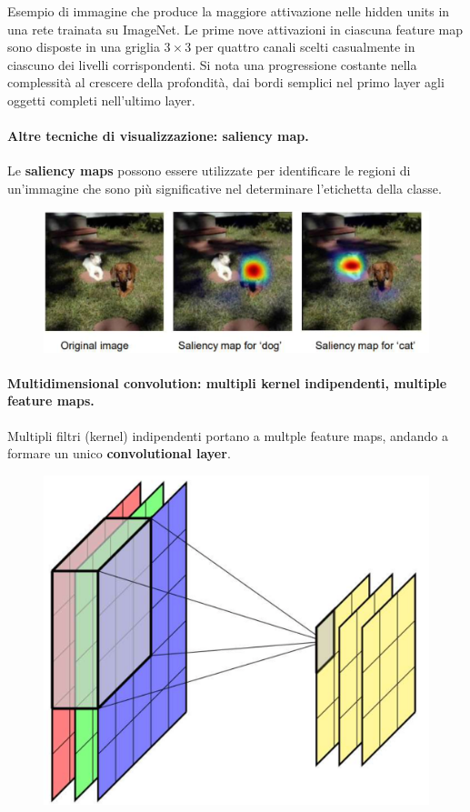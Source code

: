 Esempio di immagine che produce la maggiore attivazione nelle hidden units in una rete trainata su ImageNet. Le prime nove attivazioni in ciascuna feature map sono disposte in una griglia $3\times3$ per quattro canali scelti casualmente in ciascuno dei livelli corrispondenti. Si nota una progressione costante nella complessità al crescere della profondità, dai bordi semplici nel primo layer agli oggetti completi nell'ultimo layer.
\newpage
\paragraph{Altre tecniche di visualizzazione: saliency map.}
Le \textbf{saliency maps} possono essere utilizzate per identificare le regioni di un'immagine che sono più significative nel determinare l'etichetta della classe.
\begin{figure}[!h]
    \includegraphics[scale=.4]{images/cnn/saliency_map.png}
    \centering
\end{figure}


\paragraph{Multidimensional convolution: multipli kernel indipendenti, multiple feature maps.} Multipli filtri (kernel) indipendenti portano a multple feature maps, andando a formare un unico \textbf{convolutional layer}.
\begin{figure}[!h]
    \includegraphics[scale=.3]{images/cnn/mult.png}
    \centering
\end{figure}


